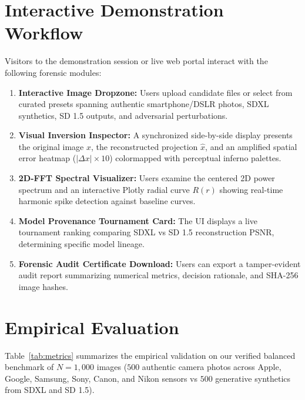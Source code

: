 \documentclass[letterpaper]{article}
\begin{document}
\section{Interactive Demonstration Workflow}
\label{sec:workflow}

Visitors to the demonstration session or live web portal interact with the following forensic modules:
\begin{enumerate}
    \item \textbf{Interactive Image Dropzone:} Users upload candidate files or select from curated presets spanning authentic smartphone/DSLR photos, SDXL synthetics, SD 1.5 outputs, and adversarial perturbations.
    \item \textbf{Visual Inversion Inspector:} A synchronized side-by-side display presents the original image $x$, the reconstructed projection $\hat{x}$, and an amplified spatial error heatmap ($|\Delta x| \times 10$) colormapped with perceptual inferno palettes.
    \item \textbf{2D-FFT Spectral Visualizer:} Users examine the centered 2D power spectrum and an interactive Plotly radial curve $R(r)$ showing real-time harmonic spike detection against baseline curves.
    \item \textbf{Model Provenance Tournament Card:} The UI displays a live tournament ranking comparing SDXL vs SD 1.5 reconstruction PSNR, determining specific model lineage.
    \item \textbf{Forensic Audit Certificate Download:} Users can export a tamper-evident audit report summarizing numerical metrics, decision rationale, and SHA-256 image hashes.
\end{enumerate}

\section{Empirical Evaluation}
\label{sec:evaluation}

Table~\ref{tab:metrics} summarizes the empirical validation on our verified balanced benchmark of $N=1,000$ images ($500$ authentic camera photos across Apple, Google, Samsung, Sony, Canon, and Nikon sensors vs $500$ generative synthetics from SDXL and SD 1.5).
\end{document}
